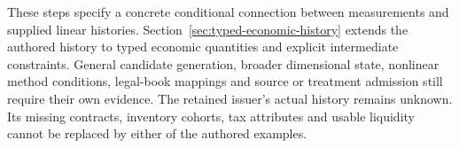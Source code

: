 These steps specify a concrete conditional connection between measurements and
supplied linear histories. Section~\ref{sec:typed-economic-history} extends
the authored history to typed economic quantities and explicit intermediate
constraints. General candidate generation, broader dimensional state, nonlinear
method conditions, legal-book mappings and source or treatment admission still
require their own evidence. The retained issuer's actual history
remains unknown. Its missing contracts, inventory cohorts, tax attributes and
usable liquidity cannot be replaced by either of the authored examples.
